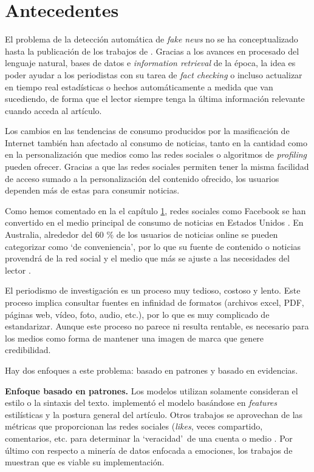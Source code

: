 \section{Antecedentes}

El problema de la detección automática de \textit{fake news} no se ha conceptualizado hasta la publicación de los trabajos de \citet{Flew2012, Cohen2011}. Gracias a los avances en procesado del lenguaje natural, bases de datos e \textit{information retrieval} de la época, la idea es poder ayudar a los periodistas con su tarea de \textit{fact checking} o incluso actualizar en tiempo real estadísticas o hechos automáticamente a medida que van sucediendo, de forma que el lector siempre tenga la última información relevante cuando acceda al artículo.

Los cambios en las tendencias de consumo producidos por la masificación de Internet también han afectado al consumo de noticias, tanto en la cantidad como en la personalización que medios como las redes sociales o algoritmos de \textit{profiling} pueden ofrecer. Gracias a que las redes sociales permiten tener la misma facilidad de acceso sumado a la personalización del contenido ofrecido, los usuarios dependen más de estas para consumir noticias.

Como hemos comentado en la el capítulo \hyperref[chapter:1]{1}, redes sociales como Facebook se han convertido en el medio principal de consumo de noticias en Estados Unidos \citep{Gottfried2016,Reid2017}. En Australia, alrededor del 60 \% de los usuarios de noticias online se pueden categorizar como `de conveniencia', por lo que su fuente de contenido o noticias provendrá de la red social y el medio que más se ajuste a las necesidades del lector \citep{Daniel2009}.

El periodismo de investigación es un proceso muy tedioso, costoso y lento. Este proceso implica consultar fuentes en infinidad de formatos (archivos excel, PDF, páginas web, vídeo, foto, audio, etc.), por lo que es muy complicado de estandarizar. Aunque este proceso no parece ni resulta rentable, es necesario para los medios como forma de mantener una imagen de marca que genere credibilidad.

Hay dos enfoques a este problema: basado en patrones y basado en evidencias.

\textbf{Enfoque basado en patrones.} Los modelos utilizan solamente consideran el estilo o la sintaxis del texto. \citet{Popat2016} implementó el modelo basándose en \textit{features} estilísticas y la postura general del artículo. Otros trabajos se aprovechan de las métricas que proporcionan las redes sociales (\textit{likes}, veces compartido, comentarios, etc. para determinar la `veracidad'\ de una cuenta o medio \citep{Liu2017,Vo2018,Volkova2017,Yu2017,Ajao2019,Popat2016,Benamira2019}. Por último con respecto a minería de datos enfocada a emociones, los trabajos de \citet{Ajao2019,Giachanou2019,Zhang2019} muestran que es viable su implementación.

